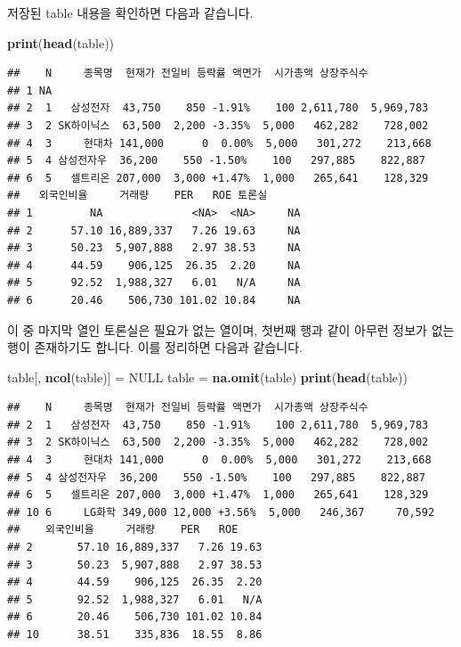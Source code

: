 \documentclass[]{book}
\newenvironment{Shaded}{\begin{snugshade}}{\end{snugshade}}
\newcommand{\KeywordTok}[1]{\textcolor[rgb]{0.13,0.29,0.53}{\textbf{#1}}}
\newcommand{\NormalTok}[1]{#1}
\newcommand{\OtherTok}[1]{\textcolor[rgb]{0.56,0.35,0.01}{#1}}
\newcommand{\StringTok}[1]{\textcolor[rgb]{0.31,0.60,0.02}{#1}}
\begin{document}
저장된 table 내용을 확인하면 다음과 같습니다.

\begin{Shaded}
\begin{Highlighting}[]
\KeywordTok{print}\NormalTok{(}\KeywordTok{head}\NormalTok{(table))}
\end{Highlighting}
\end{Shaded}

\begin{verbatim}
##    N     종목명  현재가 전일비 등락률 액면가  시가총액 상장주식수
## 1 NA                                                             
## 2  1   삼성전자  43,750    850 -1.91%    100 2,611,780  5,969,783
## 3  2 SK하이닉스  63,500  2,200 -3.35%  5,000   462,282    728,002
## 4  3     현대차 141,000      0  0.00%  5,000   301,272    213,668
## 5  4 삼성전자우  36,200    550 -1.50%    100   297,885    822,887
## 6  5   셀트리온 207,000  3,000 +1.47%  1,000   265,641    128,329
##   외국인비율     거래량    PER   ROE 토론실
## 1         NA              <NA>  <NA>     NA
## 2      57.10 16,889,337   7.26 19.63     NA
## 3      50.23  5,907,888   2.97 38.53     NA
## 4      44.59    906,125  26.35  2.20     NA
## 5      92.52  1,988,327   6.01   N/A     NA
## 6      20.46    506,730 101.02 10.84     NA
\end{verbatim}

이 중 마지막 열인 토론실은 필요가 없는 열이며, 첫번째 행과 같이 아무런 정보가 없는 행이 존재하기도 합니다. 이를 정리하면 다음과 같습니다.

\begin{Shaded}
\begin{Highlighting}[]
\NormalTok{table[, }\KeywordTok{ncol}\NormalTok{(table)] =}\StringTok{ }\OtherTok{NULL}
\NormalTok{table =}\StringTok{ }\KeywordTok{na.omit}\NormalTok{(table)}
\KeywordTok{print}\NormalTok{(}\KeywordTok{head}\NormalTok{(table))}
\end{Highlighting}
\end{Shaded}

\begin{verbatim}
##    N     종목명  현재가 전일비 등락률 액면가  시가총액 상장주식수
## 2  1   삼성전자  43,750    850 -1.91%    100 2,611,780  5,969,783
## 3  2 SK하이닉스  63,500  2,200 -3.35%  5,000   462,282    728,002
## 4  3     현대차 141,000      0  0.00%  5,000   301,272    213,668
## 5  4 삼성전자우  36,200    550 -1.50%    100   297,885    822,887
## 6  5   셀트리온 207,000  3,000 +1.47%  1,000   265,641    128,329
## 10 6     LG화학 349,000 12,000 +3.56%  5,000   246,367     70,592
##    외국인비율     거래량    PER   ROE
## 2       57.10 16,889,337   7.26 19.63
## 3       50.23  5,907,888   2.97 38.53
## 4       44.59    906,125  26.35  2.20
## 5       92.52  1,988,327   6.01   N/A
## 6       20.46    506,730 101.02 10.84
## 10      38.51    335,836  18.55  8.86
\end{verbatim}
\end{document}
